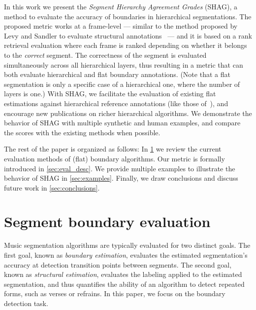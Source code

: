 \documentclass{article}
\begin{document}

In this work we present the \emph{Segment Hierarchy Agreement Grades} (SHAG), a method to evaluate the accuracy of boundaries in hierarchical segmentations.
The proposed metric works at a frame-level --- similar to the method proposed by Levy and Sandler to evaluate structural annotations~\cite{Levy2008} --- and it is based on a rank retrieval evaluation where each frame is ranked depending on whether it belongs to the \emph{correct} segment.
The correctness of the segment is evaluated simultaneously across all hierarchical layers, thus resulting in a metric that can both evaluate hierarchical and flat boundary annotations. 
(Note that a flat segmentation is only a specific case of a hierarchical one, where the number of layers is one.)
With SHAG, we facilitate the evaluation of existing flat estimations against hierarchical reference annotations (like those of~\cite{Smith2011}), and encourage new publications on richer hierarchical algorithms.
We demonstrate the behavior of SHAG with multiple synthetic and human examples, and compare the scores with the existing methods when possible.


The rest of the paper is organized as follows: In \cref{sec:curr_meth} we review the current evaluation methods of (flat) boundary algorithms. 
Our metric is formally introduced in \cref{sec:eval_desc}. 
We provide multiple examples to illustrate the behavior of SHAG in \cref{sec:examples}.
Finally, we draw conclusions and discuss future work in \cref{sec:conclusions}.

\section{Segment boundary evaluation}\label{sec:curr_meth}

Music segmentation algorithms are typically evaluated for two distinct goals.  
The first goal, known as \emph{boundary estimation}, evaluates the estimated segmentation's accuracy at detection transition points between segments.
The second goal, known as \emph{structural estimation}, evaluates the labeling applied to the estimated segmentation, and thus quantifies the ability of an algorithm to detect repeated
forms, such as verses or refrains.  In this paper, we focus on the boundary detection task.
\end{document}
